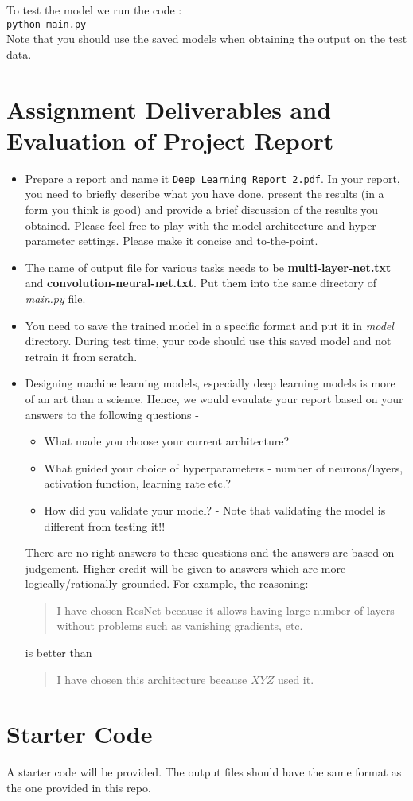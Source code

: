 \documentclass{article}
\begin{document}
\noindent To test the model we run the code :\\
\texttt{python main.py}\\

Note that you should use the saved models when obtaining the output on the test data.

\section*{Assignment Deliverables and Evaluation of Project Report}

\begin{itemize}
    
    \item Prepare a report and name it \texttt{Deep\_Learning\_Report\_2.pdf}. In your report, you need to briefly describe what you have done, present the results (in a form you think is good) and provide a brief discussion of the results you obtained. Please feel free to play with the model architecture and hyper-parameter settings. Please make it concise and to-the-point.

    \item The name of output file for various tasks needs to be \textbf{multi-layer-net.txt} and \textbf{convolution-neural-net.txt}. Put them into the same directory of \textit{main.py} file.
    
    \item You need to save the trained model in a specific format and put it in \textit{model} directory. During test time, your code should use this saved model and not retrain it from scratch.
    
    \item Designing machine learning models, especially deep learning models is more of an art than a science. Hence, we would evaulate your report based on your answers to the following questions -
\begin{itemize}
\item What made you choose your current architecture?
\item What guided your choice of hyperparameters - number of neurons/layers, activation function, learning rate etc.?
\item How did you validate your model? - Note that validating the model is different from testing it!!
\end{itemize}

There are no right answers to these questions and the answers are based on judgement. Higher credit will be given to answers which are more logically/rationally grounded. For example, the reasoning:

\begin{quote}
I have chosen ResNet because it allows having large number of layers without problems such as vanishing gradients, etc.  
\end{quote}

is better than

\begin{quote}
I have chosen this architecture because $XYZ$ used it.
\end{quote}
\end{itemize}


\section*{Starter Code}

A starter code will be provided. The output files should have the same format as the one provided in this repo.
\end{document}

